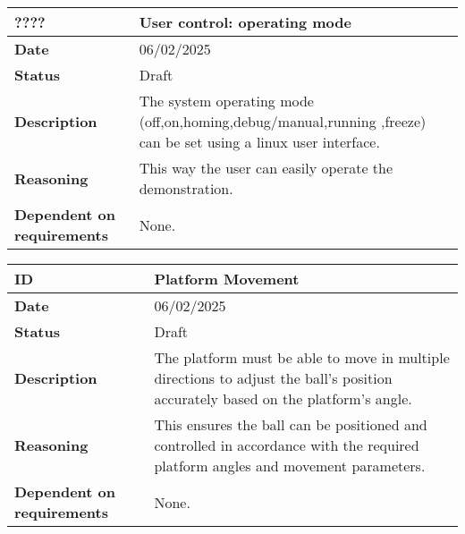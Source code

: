 \documentclass{article}
\begin{document}
\begin{table}[H]
    \renewcommand{\arraystretch}{1.3}
    \begin{tabular}{|l|p{10cm}|}
        \hline
        \rowcolor{gray!50}
        \textbf{????} & \textbf{User control: operating mode} \\ \hline
        \textbf{Date} & 06/02/2025 \\ \hline
        \textbf{Status} & Draft \\ \hline
        \textbf{Description} & The system operating mode (off,on,homing,debug/manual,running ,freeze) can be set using a linux user interface.\\ \hline
        \textbf{Reasoning} & This way the user can easily operate the demonstration. \\ \hline
        \textbf{Dependent on requirements} & None. \\ \hline
    \end{tabular}
\end{table}

\begin{table}[H]
    \renewcommand{\arraystretch}{1.3}
    \begin{tabular}{|l|p{10cm}|}
        \hline
        \rowcolor{gray!50}
        \textbf{ID} & \textbf{Platform Movement} \\ \hline
        \textbf{Date} & 06/02/2025 \\ \hline
        \textbf{Status} & Draft \\ \hline
        \textbf{Description} & The platform must be able to move in multiple directions to adjust the ball's position accurately based on the platform's angle. \\ \hline
        \textbf{Reasoning} & This ensures the ball can be positioned and controlled in accordance with the required platform angles and movement parameters. \\ \hline
        \textbf{Dependent on requirements} & None. \\ \hline
    \end{tabular}
\end{table}
\end{document}
